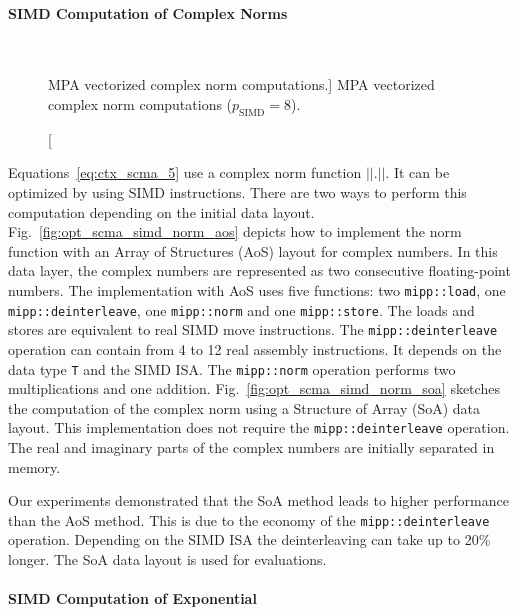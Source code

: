 \paragraph{SIMD Computation of Complex Norms}

\begin{figure}[htp]
  \centering
  \\
  \caption
    [MPA vectorized complex norm computations.]
    {MPA vectorized complex norm computations ($p_\text{SIMD} = 8$).}
  \label{fig:opt_scma_simd_norm}
\end{figure}

Equations~\eqref{eq:ctx_scma_5} use a complex norm function $||.||$. It can be
optimized by using SIMD instructions. There are two ways to perform this
computation depending on the initial data layout.
Fig.~\ref{fig:opt_scma_simd_norm_aos} depicts how to implement the norm function
with an Array of Structures (AoS) layout for complex numbers. In this data
layer, the complex numbers are represented as two consecutive floating-point
numbers. The implementation with AoS uses five \MIPP functions: two
\verb|mipp::load|, one \verb|mipp::deinterleave|, one \verb|mipp::norm| and one
\verb|mipp::store|. The \MIPP loads and stores are equivalent to real SIMD
move instructions. The \verb|mipp::deinterleave| operation can contain from 4 to
12 real assembly instructions. It depends on the data type \verb|T| and the SIMD
ISA. The \verb|mipp::norm| operation performs two multiplications and one
addition. Fig.~\ref{fig:opt_scma_simd_norm_soa} sketches the computation of the
complex norm using a Structure of Array (SoA) data layout. This implementation
does not require the \MIPP \verb|mipp::deinterleave| operation. The real
and imaginary parts of the complex numbers are initially separated in memory.

Our experiments demonstrated that the SoA method leads to higher performance
than the AoS method. This is due to the economy of the \verb|mipp::deinterleave|
operation. Depending on the SIMD ISA the deinterleaving can take up to 20\%
longer. The SoA data layout is used for evaluations.

\paragraph{SIMD Computation of Exponential}

